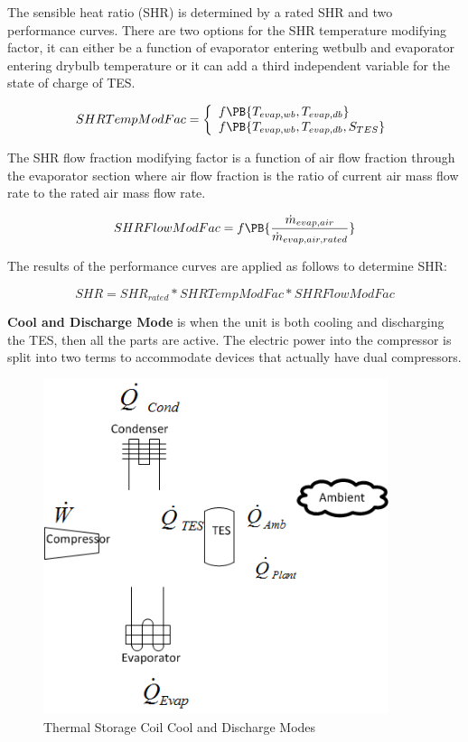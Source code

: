 The sensible heat ratio (SHR) is determined by a rated SHR and two performance curves. There are two options for the SHR temperature modifying factor, it can either be a function of evaporator entering wetbulb and evaporator entering drybulb temperature or it can add a third independent variable for the state of charge of TES.

\begin{equation}
  SHRTempModFac = \left\{
    \begin{array}{l}
      f\PB{T_{evap,wb},T_{evap,db}} \\
      f\PB{T_{evap,wb},T_{evap,db},S_{TES}}
    \end{array}
  \right.
\end{equation}

The SHR flow fraction modifying factor is a function of air flow fraction through the evaporator section where air flow fraction is the ratio of current air mass flow rate to the rated air mass flow rate.

\begin{equation}
SHRFlowModFac = f\PB{\frac{\dot{m}_{evap,air}}{\dot{m}_{evap,air,rated}}}
\end{equation}

The results of the performance curves are applied as follows to determine SHR:

\begin{equation}
SHR = SH{R_{rated}}*SHRTempModFac*SHRFlowModFac
\end{equation}

\textbf{Cool and Discharge Mode} is when the unit is both cooling and discharging the TES, then all the parts are active. The electric power into the compressor is split into two terms to accommodate devices that actually have dual compressors.

\begin{figure}[hbtp] %
\centering
\includegraphics[width=0.9\textwidth, height=0.9\textheight, keepaspectratio=true]{media/image4331.png}
\caption{Thermal Storage Coil Cool and Discharge Modes \protect \label{fig:thermal-storage-coil-cool-and-discharge-modes}}
\end{figure}

